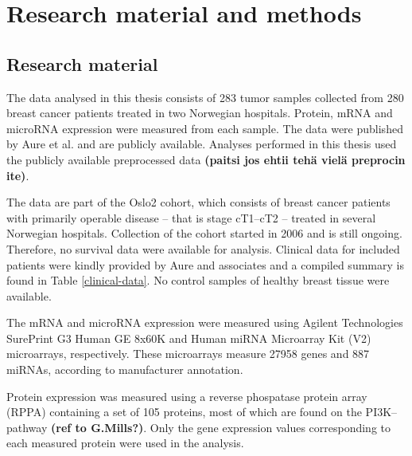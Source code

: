 


\section{Research material and methods}\label{material-and-methods}

\subsection{Research material}

The data analysed in this thesis consists of 283 tumor samples collected from
280 breast cancer patients treated in two Norwegian hospitals. Protein, mRNA
and microRNA expression were measured from each sample. The data were
published by Aure et al. \citep{Aure2015} and are publicly available. Analyses
performed in this thesis used the publicly available preprocessed data
\textbf{(paitsi jos ehtii tehä vielä preprocin ite)}.

The data are part of the Oslo2 cohort, which consists of breast cancer
patients with primarily operable disease -- that is stage cT1--cT2 -- treated
in several Norwegian hospitals. Collection of the cohort started in 2006 and
is still ongoing. Therefore, no survival data were available for analysis.
Clinical data for included patients were kindly provided by Aure and
associates and a compiled summary is found in Table \ref{clinical-data}. No
control samples of healthy breast tissue were available.



The mRNA and microRNA expression were measured using Agilent Technologies
SurePrint G3 Human GE 8x60K and Human miRNA Microarray Kit (V2) microarrays,
respectively. These microarrays measure 27958 genes and 887 miRNAs, according to
manufacturer annotation.

Protein expression was measured using a reverse phospatase protein array
(RPPA) containing a set of 105 proteins, most of which are found on the PI3K--
pathway \textbf{(ref to G.Mills?)}. Only the gene expression values
corresponding to each measured protein were used in the analysis.






